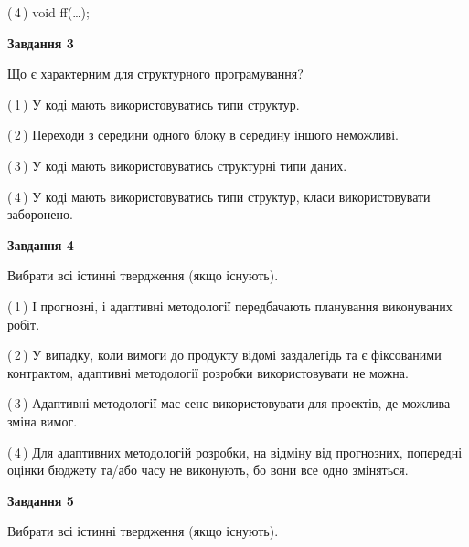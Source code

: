 \documentclass[10pt, ukrainian]{article}
\begin{document}
{\begin {large}
(\,4\,) void ff(…);%


{\begin {center}\textbf{Завдання 3}\end {center}}\par
Що є характерним для структурного програмування?\par
\vspace{2mm}



(\,1\,) У коді мають використовуватись типи структур. %



(\,2\,) Переходи з середини одного блоку в середину іншого неможливі. %



(\,3\,) У коді мають використовуватись структурні типи даних. %



(\,4\,) У коді мають використовуватись типи структур, класи використовувати заборонено. %


{\begin {center}\textbf{Завдання 4}\end {center}}\par
Вибрати всі істинні твердження (якщо існують).\par
\vspace{2mm}



(\,1\,) І прогнозні, і адаптивні методології передбачають планування виконуваних робіт. %



(\,2\,) У випадку, коли вимоги до продукту відомі заздалегідь та є фіксованими контрактом, адаптивні методології розробки використовувати не можна. %



(\,3\,) Адаптивні методології має сенс використовувати для проектів, де можлива зміна вимог. %



(\,4\,) Для адаптивних методологій розробки, на відміну від прогнозних, попередні оцінки бюджету та/або часу не виконують, бо вони все одно зміняться. %


{\begin {center}\textbf{Завдання 5}\end {center}}\par
Вибрати всі істинні твердження (якщо існують).\par
\vspace{2mm}




\end{large}}
\end{document}
